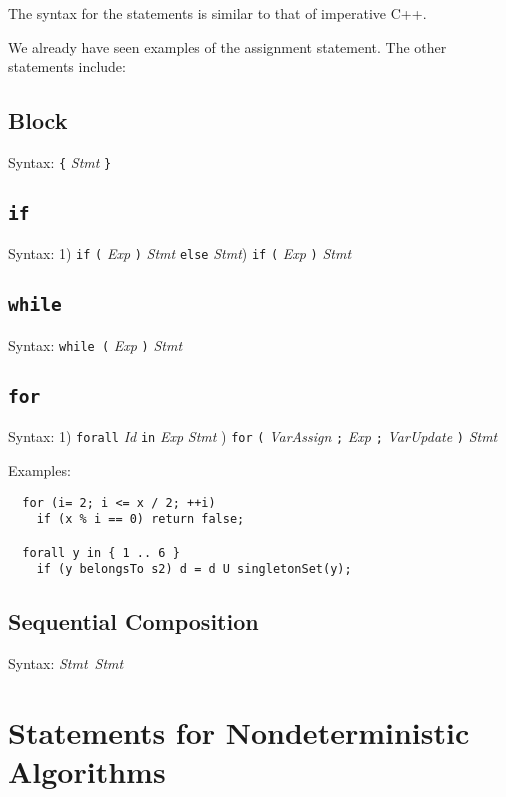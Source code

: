 \documentclass[a4paper]{report}
\begin{document}
The syntax for the statements is similar to that of imperative C++. 

We already have seen examples of the assignment statement.
The other statements include:

\subsection{Block}

Syntax: \verb'{' {\it Stmt} \verb'}'

\subsection{\texttt{if}}


Syntax: 1) \verb"if" \verb"(" {\it Exp} \verb")" {\it Stmt} \verb"else" {\it Stmt}) \verb"if" \verb"(" {\it Exp} \verb")" {\it Stmt} 


\subsection{\texttt{while}}

Syntax: \verb'while (' {\it Exp} \verb')' {\it Stmt} 


\subsection{\texttt{for}}

Syntax: 1) \verb"forall" {\it Id} \verb"in" {\it Exp}  {\it Stmt} ) \verb"for" \verb"(" {\it VarAssign} \verb";" {\it Exp} \verb";" {\it VarUpdate} \verb")" {\it Stmt}

Examples:
\begin{verbatim}
  for (i= 2; i <= x / 2; ++i) 
    if (x % i == 0) return false;

  forall y in { 1 .. 6 }
    if (y belongsTo s2) d = d U singletonSet(y);
\end{verbatim}



\subsection{Sequential Composition}

Syntax: {\it Stmt}~{\it Stmt}

\section{Statements for Nondeterministic Algorithms}
\end{document}
